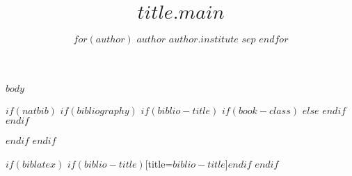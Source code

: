 \documentclass[
$for(classoption)$
  $classoption$$sep$,
$endfor$
]{$documentclass$}
\author{
$for(author)$
$author$
$author.institute$
$sep$
\And
$endfor$
}
\title{$title.main$}
\begin{document}
$body$

$if(natbib)$
$if(bibliography)$
$if(biblio-title)$
$if(book-class)$
\renewcommand\bibname{$biblio-title$}
$else$
\renewcommand\refname{$biblio-title$}
$endif$
$endif$

$endif$
$endif$

$if(biblatex)$
\printbibliography$if(biblio-title)$[title=$biblio-title$]$endif$
$endif$
\end{document}
